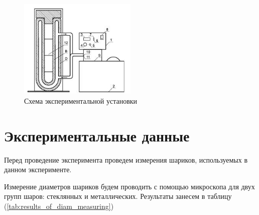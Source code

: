 \documentclass[12pt,a4paper]{article}
\begin{document}
\begin{figure}[h!]
	\begin{center}
		\includegraphics[width = 0.5\textwidth]{Scem_of_facility}
		\caption{Схема экспериментальной установки}
		\label{fig:facility}
	\end{center}
\end{figure}

\newpage

\section{Экспериментальные данные}

Перед проведение эксперимента проведем измерения шариков, используемых в данном эксперименте.

Измерение диаметров шариков будем проводить с помощью микроскопа для двух групп шаров: стеклянных и металлических. Результаты занесем в таблицу (\ref{tab:results_of_diam_measuring})
\end{document}

